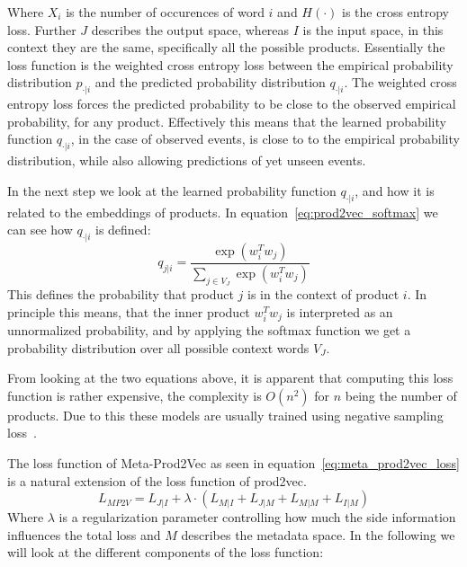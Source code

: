 Where $X_i$ is the number of occurences of word $i$ and $H(\cdot)$ is the cross entropy loss.
Further $J$ describes the output space, whereas $I$ is the input space, in this context they are the same, specifically all the possible products.
Essentially the loss function is the weighted cross entropy loss between the empirical probability distribution $p_{\cdot|i}$ and the predicted probability distribution $q_{\cdot|i}$.
The weighted cross entropy loss forces the predicted probability to be close to the observed empirical probability, for any product.
Effectively this means that the learned probability function $q_{\cdot|i}$, in the case of observed events, is close to to the empirical probability distribution, while also allowing predictions of yet unseen events.
\par
In the next step we look at the learned probability function $q_{\cdot|i}$, and how it is related to the embeddings of products.
In equation~\ref{eq:prod2vec_softmax} we can see how $q_{\cdot|i}$ is defined:
\begin{equation}\label{eq:prod2vec_softmax}
    q_{j|i} = \frac{\exp(w_i^Tw_j)}{\sum_{j \in V_J} \exp(w_i^Tw_{j})}
\end{equation}
This defines the probability that product $j$ is in the context of product $i$.
In principle this means, that the inner product $w_i^Tw_j$ is interpreted as an unnormalized probability, and by applying the softmax function we get a probability distribution over all possible context words $V_J$.
\par
From looking at the two equations above, it is apparent that computing this loss function is rather expensive, the complexity is $O(n^2)$ for $n$ being the number of products.
Due to this these models are usually trained using negative sampling loss~\cite{neg_sampling}.
\par
The loss function of Meta-Prod2Vec as seen in equation~\ref{eq:meta_prod2vec_loss} is a natural extension of the loss function of prod2vec.
\begin{equation}\label{eq:meta_prod2vec_loss}
    L_{MP2V} = L_{J|I} + \lambda \cdot (L_{M|I} + L_{J|M} + L_{M|M} + L_{I|M})
\end{equation}
Where $\lambda$ is a regularization parameter controlling how much the side information influences the total loss and $M$ describes the metadata space.
In the following we will look at the different components of the loss function:
